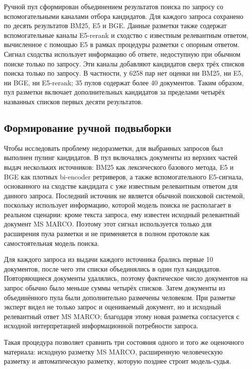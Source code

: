 \documentclass[runningheads,a4paper]{llncs}
\begin{document}
Ручной пул сформирован объединением результатов поиска по запросу со вспомогательными каналами отбора кандидатов. Для каждого запроса сохранено по десять результатов BM25, E5 и BGE. Данные разметки также содержат вспомогательные каналы E5-rerank и сходство с известным релевантным ответом, вычисленное с помощью E5 в рамках процедуры разметки с опорным ответом. Сигнал сходства использует информацию об ответе, недоступную при обычном поиске только по запросу. Эти каналы добавляют кандидатов сверх трёх списков поиска только по запросу. В частности, у 6258 пар нет оценки ни BM25, ни E5, ни BGE, ни E5-rerank; 35 пулов содержат более 40 документов. Таким образом, пул разметки включает дополнительных кандидатов за пределами четырёх названных списков первых десяти результатов.

\subsection{Формирование ручной подвыборки}

Чтобы исследовать проблему недоразметки, для выбранных запросов был выполнен пулинг кандидатов. В пул включались документы из верхних частей выдач нескольких источников: BM25 как лексического базового метода, E5 и BGE как плотных bi-encoder ретриверов, а также вспомогательного E5-сигнала, основанного на сходстве кандидата с уже известным релевантным ответом для данного запроса. Последний источник не является обычной поисковой системой, поскольку использует информацию, которой модель поиска не располагает в реальном сценарии: кроме текста запроса, ему известен исходный релевантный документ MS MARCO. Поэтому этот сигнал используется только для расширения пула разметки и не применяется в полном протоколе как самостоятельная модель поиска.

Для каждого запроса из выдачи каждого источника брались первые 10 документов, после чего эти списки объединялись в один пул кандидатов. Повторяющиеся документы удалялись, поэтому фактическое число документов на запрос обычно было меньше суммы четырёх списков. Затем документы из объединённого пула были дополнительно размечены человеком. При разметке эксперт видел не только запрос и оцениваемый документ, но и исходный релевантный ответ MS MARCO; благодаря этому новая разметка согласуется с исходной интерпретацией информационной потребности запроса.

Такая процедура позволяет сравнить три состояния одного и того же оценочного материала: исходную разметку MS MARCO, расширенную человеческую разметку и автоматическую разметку, которую позднее строит модель-судья.
\end{document}
